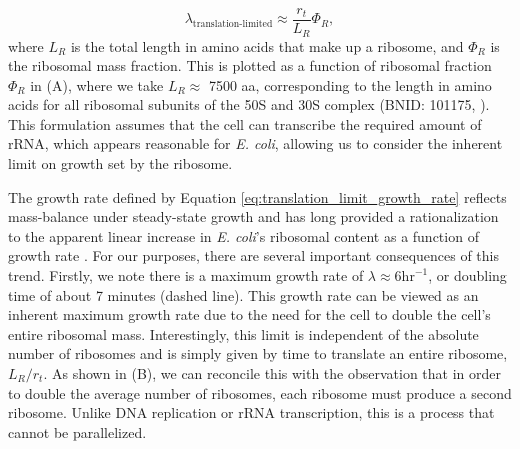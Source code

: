 \begin{equation}
\lambda_{\textrm{translation-limited}} \approx \frac{r_t}{L_R}  \Phi_R,
\label{eq:translation_limit_growth_rate}
\end{equation}
where $L_R$ is the total length in amino acids that make up a ribosome, and
$\Phi_R$ is the ribosomal mass fraction. This is plotted as a function of
ribosomal fraction $\Phi_R$ in (A), where we take $L_R
\approx$ 7500 aa, corresponding to the length in amino acids for all ribosomal
subunits of the 50S and 30S complex (BNID: 101175, \citep{milo2010}). This
formulation assumes that the cell can transcribe the required amount of rRNA,
which appears reasonable for \textit{E. coli}, allowing us to
consider the inherent limit on growth set by the ribosome.

The growth rate defined by Equation \ref{eq:translation_limit_growth_rate}
reflects mass-balance under steady-state growth and has long provided a
rationalization to the apparent linear increase in \textit{E. coli}'s
ribosomal content as a function of growth rate \citep{Goldberger1979,
scott2010}. For our purposes, there are several important consequences of
this trend. Firstly, we note there is a maximum growth rate of $\lambda
\approx 6 \text{hr}^{-1}$, or doubling time of about 7 minutes (dashed line).
This growth rate can be viewed as an inherent maximum growth rate due to the
need for the cell to double the cell's entire ribosomal mass. Interestingly,
this limit is independent of the absolute number of ribosomes and is simply
given by time to translate an entire ribosome, $L_R/ r_t$. As shown in
(B), we can reconcile this with the observation that in
order to double the average number of ribosomes, each ribosome must produce a
second ribosome. Unlike DNA replication or rRNA transcription, this is a
process that cannot be parallelized.

